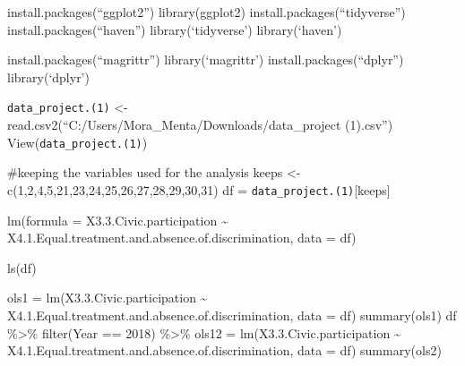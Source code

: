 

install.packages(``ggplot2'') library(ggplot2)
install.packages(``tidyverse'') install.packages(``haven'')
library(`tidyverse') library(`haven')

install.packages(``magrittr'') library(`magrittr')
install.packages(``dplyr'') library(`dplyr')

\texttt{data\_project.(1)} \textless-
read.csv2(``C:/Users/Mora\_Menta/Downloads/data\_project (1).csv'')
View(\texttt{data\_project.(1)})

\#keeping the variables used for the analysis keeps \textless-
c(1,2,4,5,21,23,24,25,26,27,28,29,30,31) df =
\texttt{data\_project.(1)}{[}keeps{]}

lm(formula = X3.3.Civic.participation \textasciitilde{}
X4.1.Equal.treatment.and.absence.of.discrimination, data = df)

ls(df)

ols1 = lm(X3.3.Civic.participation \textasciitilde{}
X4.1.Equal.treatment.and.absence.of.discrimination, data = df)
summary(ols1) df \%\textgreater\% filter(Year == 2018) \%\textgreater\%
ols12 = lm(X3.3.Civic.participation \textasciitilde{}
X4.1.Equal.treatment.and.absence.of.discrimination, data = df)
summary(ols2)


